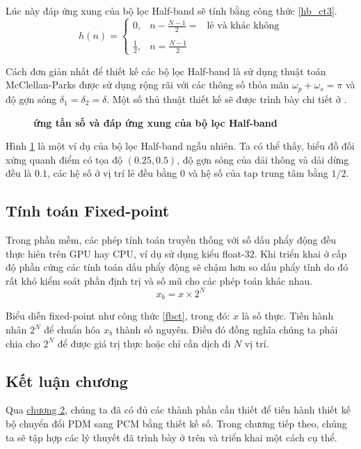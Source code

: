 Lúc này đáp ứng xung của bộ lọc Half-band sẽ tính bằng công thức \ref{hb_ct3}.
\begin{equation}\label{hb_ct3}
 h(n)=\left\{\begin{matrix}
0, & \displaystyle n - \frac{N-1}{2} = & \text{lẻ và khác không}\\ 
& &\\ 
\displaystyle \frac{1}{2},& n = \displaystyle \frac{N-1}{2} &
\end{matrix}\right.
\end{equation}

Cách đơn giản nhất để thiết kế các bộ lọc Half-band là sử dụng thuật toán McClellan-Parks \cite{rao2018digital} được sử dụng rộng rãi với các thông số thỏa mãn $\omega_p + \omega_s = \pi$ và độ gợn sóng $\delta_1=\delta_2=\delta$. Một số thủ thuật thiết kế sẽ được trình bày chi tiết ở \cite{half_band}.

\begin{figure}[ht!]
    \centering
    
    \caption[Đáp ứng tần số cường độ và đáp ứng xung của bộ lọc Half-band]{\bfseries \fontsize{12pt}{0pt} ứng tần số và đáp ứng xung của bộ lọc Half-band}
    \label{half_band_example}
\end{figure}
Hình \ref{half_band_example} là một ví dụ của bộ lọc Half-band ngẫu nhiên. Ta có thể thấy, biểu đồ đối xứng quanh điểm có tọa độ $(0.25, 0.5)$, độ gợn sóng của dải thông và dải dừng đều là $0.1$, các hệ số ở vị trí lẻ đều bằng 0 và hệ số của tap trung tâm bằng $1/2$.

\subsection{Tính toán Fixed-point}
Trong phần mềm, các phép tính toán truyền thống với số dấu phẩy động đều thực hiên trên GPU hay CPU, ví dụ sử dụng kiểu float-32. Khi triển khai ở cấp độ phần cứng các tính toán dấu phẩy động sẽ chậm hơn so dấu phẩy tĩnh do đó rất khó kiểm soát phần định trị và số mũ cho các phép toán khác nhau.
\begin{equation} \label{fbct}
    x_b = x \times 2^N
\end{equation}

Biểu diễn fixed-point như công thức \ref{fbct}, trong đó: $x$ là số thực. Tiến hành nhân $2^N$ để chuẩn hóa $x_b$ thành số nguyên. Điều đó đồng nghĩa chúng ta phải chia cho $2^N$ để được giá trị thực hoặc chỉ cần dịch đi $N$ vị trí.
\subsection{Kết luận chương}
Qua \hyperref[chuong2]{chương 2}, chúng ta đã có đủ các thành phần cần thiết để tiến hành thiết kế bộ chuyển đổi PDM sang PCM bằng thiết kế số. Trong chương tiếp theo, chúng ta sẽ tập hợp các lý thuyết đã trình bày ở trên và triển khai một cách cụ thể.
\newpage
